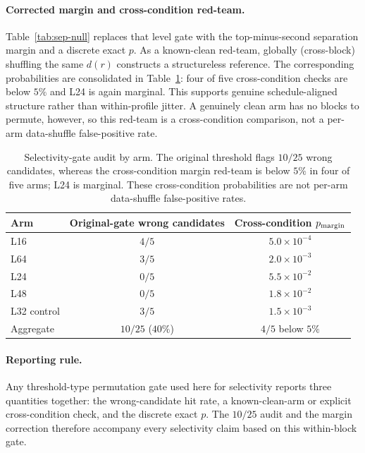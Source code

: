 \documentclass{article}
\begin{document}
\paragraph{Corrected margin and cross-condition red-team.}
Table~\ref{tab:sep-null} replaces that level gate with the top-minus-second
separation margin and a discrete exact $p$. As a known-clean red-team, globally
(cross-block) shuffling the same $d(r)$ constructs a structureless reference.
The corresponding probabilities are consolidated in
Table~\ref{tab:gate-audit}: four of five cross-condition checks are below $5\%$
and L24 is again marginal. This supports genuine schedule-aligned structure
rather than within-profile jitter. A genuinely clean arm has no blocks to
permute, however, so this red-team is a cross-condition comparison, not a
per-arm data-shuffle false-positive rate.

\begin{table}[H]
\centering
\footnotesize
\setlength{\tabcolsep}{6pt}
\begin{tabular}{@{}lcc@{}}
\toprule
Arm & Original-gate wrong candidates & Cross-condition $p_{\rm margin}$ \\
\midrule
L16 & $4/5$ & $5.0\times10^{-4}$ \\
L64 & $3/5$ & $2.0\times10^{-3}$ \\
L24 & $0/5$ & $5.5\times10^{-2}$ \\
L48 & $0/5$ & $1.8\times10^{-2}$ \\
L32 control & $3/5$ & $1.5\times10^{-3}$ \\
\midrule
Aggregate & $10/25$ ($40\%$) & $4/5$ below $5\%$ \\
\bottomrule
\end{tabular}
\caption{Selectivity-gate audit by arm. The original threshold flags
$10/25$ wrong candidates, whereas the cross-condition margin red-team is below
$5\%$ in four of five arms; L24 is marginal. These cross-condition probabilities
are not per-arm data-shuffle false-positive rates.}
\label{tab:gate-audit}
\end{table}

\paragraph{Reporting rule.}
Any threshold-type permutation gate used here for selectivity reports three
quantities together: the wrong-candidate hit rate, a known-clean-arm or explicit
cross-condition check, and the discrete exact $p$. The $10/25$ audit and the
margin correction therefore accompany every selectivity claim based on this
within-block gate.
\end{document}
